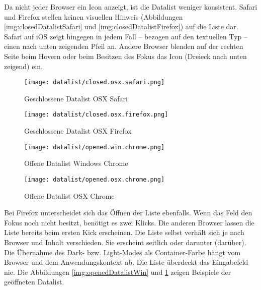 Da nicht jeder Browser ein Icon anzeigt, ist die Datalist weniger konsistent. 
Safari und Firefox stellen keinen visuellen Hinweis (Abbildungen \ref{img:closedDatalistSafari} und \ref{img:closedDatalistFirefox}) auf die Liste dar.
Safari auf iOS zeigt hingegen in jedem Fall – bezogen auf den textuellen Typ – einen nach unten zeigenden Pfeil an. 
Andere Browser blenden auf der rechten Seite beim Hovern oder beim Besitzen des Fokus das Icon (Dreieck nach unten zeigend) ein. 

\begin{figure}[!htb]
    \centering
    \begin{minipage}[b]{0.25\textwidth}
        \centering
        \begin{minipage}[t]{\textwidth}
            \centering
            \texttt{[image: datalist/closed.osx.safari.png]}
            \caption{\centering Geschlossene Datalist OSX Safari}
            \label{img:closedDatalistSafari}
        \end{minipage}
        \vspace{0.6cm}\newline
        \begin{minipage}[b]{\textwidth}
            \centering
            \texttt{[image: datalist/closed.osx.firefox.png]}
            \caption{\centering Geschlossene Datalist OSX Firefox}
            \label{img:closedDatalistFirefox}
        \end{minipage}
    \end{minipage}
    \hfill
    \begin{minipage}[b]{0.37\textwidth}
        \centering
        \texttt{[image: datalist/opened.win.chrome.png]}
        \caption{\centering Offene Datalist Windows Chrome}
        \label{img:openedDatalistWin}
    \end{minipage}
    \hfill
    \begin{minipage}[b]{0.28\textwidth}
        \centering
        \texttt{[image: datalist/opened.osx.chrome.png]}
        \caption{\centering Offene Datalist OSX Chrome}
        \label{img:openedDatalistOsx}
    \end{minipage}
\end{figure}

Bei Firefox unterscheidet sich das Öffnen der Liste ebenfalls. 
Wenn das Feld den Fokus noch nicht besitzt, benötigt es zwei Klicks. 
Die anderen Browser lassen die Liste bereits beim ersten Kick erscheinen. 
Die Liste selbst verhält sich je nach Browser und Inhalt verschieden. 
Sie erscheint seitlich oder darunter (darüber). 
Die Übernahme des Dark- bzw. Light-Modes als Container-Farbe hängt vom Browser und dem Anwendungskontext ab.
Die Liste überdeckt das Eingabefeld nie. 
Die Abbildungen \ref{img:openedDatalistWin} und \ref{img:openedDatalistOsx} zeigen Beispiele der geöffneten Datalist. 

